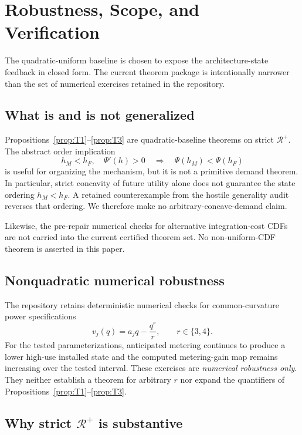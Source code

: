 \section{Robustness, Scope, and Verification}\label{sec:robustness}

The quadratic-uniform baseline is chosen to expose the architecture-state feedback in closed form. The current theorem package is intentionally narrower than the set of numerical exercises retained in the repository.

\subsection{What is and is not generalized}

Propositions~\ref{prop:T1}--\ref{prop:T3} are quadratic-baseline theorems on strict $\mathcal R^+$. The abstract order implication
\[
 h_M<h_F,\quad \Psi'(h)>0
 \quad\Longrightarrow\quad
 \Psi(h_M)<\Psi(h_F)
\]
is useful for organizing the mechanism, but it is not a primitive demand theorem. In particular, strict concavity of future utility alone does not guarantee the state ordering $h_M<h_F$. A retained counterexample from the hostile generality audit reverses that ordering. We therefore make no arbitrary-concave-demand claim.

Likewise, the pre-repair numerical checks for alternative integration-cost CDFs are not carried into the current certified theorem set. No non-uniform-CDF theorem is asserted in this paper.

\subsection{Nonquadratic numerical robustness}

The repository retains deterministic numerical checks for common-curvature power specifications
\begin{equation}
 v_j(q)=a_jq-\frac{q^r}{r},
 \qquad r\in\{3,4\}.
 \label{eq:power-utility}
\end{equation}
For the tested parameterizations, anticipated metering continues to produce a lower high-use installed state and the computed metering-gain map remains increasing over the tested interval. These exercises are \emph{numerical robustness only}. They neither establish a theorem for arbitrary $r$ nor expand the quantifiers of Propositions~\ref{prop:T1}--\ref{prop:T3}.

\subsection{Why strict $\mathcal R^+$ is substantive}

